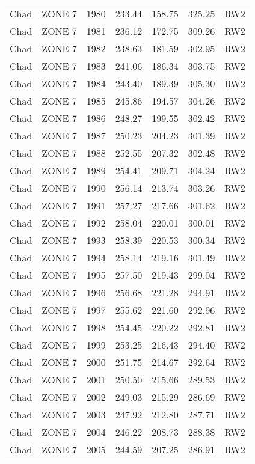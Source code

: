 \begin{longtable}{lllrrrl}
  Chad & ZONE 7 & 1980 & 233.44 & 158.75 & 325.25 & RW2 \\ 
  Chad & ZONE 7 & 1981 & 236.12 & 172.75 & 309.26 & RW2 \\ 
  Chad & ZONE 7 & 1982 & 238.63 & 181.59 & 302.95 & RW2 \\ 
  Chad & ZONE 7 & 1983 & 241.06 & 186.34 & 303.75 & RW2 \\ 
  Chad & ZONE 7 & 1984 & 243.40 & 189.39 & 305.30 & RW2 \\ 
  Chad & ZONE 7 & 1985 & 245.86 & 194.57 & 304.26 & RW2 \\ 
  Chad & ZONE 7 & 1986 & 248.27 & 199.55 & 302.42 & RW2 \\ 
  Chad & ZONE 7 & 1987 & 250.23 & 204.23 & 301.39 & RW2 \\ 
  Chad & ZONE 7 & 1988 & 252.55 & 207.32 & 302.48 & RW2 \\ 
  Chad & ZONE 7 & 1989 & 254.41 & 209.71 & 304.24 & RW2 \\ 
  Chad & ZONE 7 & 1990 & 256.14 & 213.74 & 303.26 & RW2 \\ 
  Chad & ZONE 7 & 1991 & 257.27 & 217.66 & 301.62 & RW2 \\ 
  Chad & ZONE 7 & 1992 & 258.04 & 220.01 & 300.01 & RW2 \\ 
  Chad & ZONE 7 & 1993 & 258.39 & 220.53 & 300.34 & RW2 \\ 
  Chad & ZONE 7 & 1994 & 258.14 & 219.16 & 301.49 & RW2 \\ 
  Chad & ZONE 7 & 1995 & 257.50 & 219.43 & 299.04 & RW2 \\ 
  Chad & ZONE 7 & 1996 & 256.68 & 221.28 & 294.91 & RW2 \\ 
  Chad & ZONE 7 & 1997 & 255.62 & 221.60 & 292.96 & RW2 \\ 
  Chad & ZONE 7 & 1998 & 254.45 & 220.22 & 292.81 & RW2 \\ 
  Chad & ZONE 7 & 1999 & 253.25 & 216.43 & 294.40 & RW2 \\ 
  Chad & ZONE 7 & 2000 & 251.75 & 214.67 & 292.64 & RW2 \\ 
  Chad & ZONE 7 & 2001 & 250.50 & 215.66 & 289.53 & RW2 \\ 
  Chad & ZONE 7 & 2002 & 249.03 & 215.29 & 286.69 & RW2 \\ 
  Chad & ZONE 7 & 2003 & 247.92 & 212.80 & 287.71 & RW2 \\ 
  Chad & ZONE 7 & 2004 & 246.22 & 208.73 & 288.38 & RW2 \\ 
  Chad & ZONE 7 & 2005 & 244.59 & 207.25 & 286.91 & RW2 \\ 

\end{longtable}
